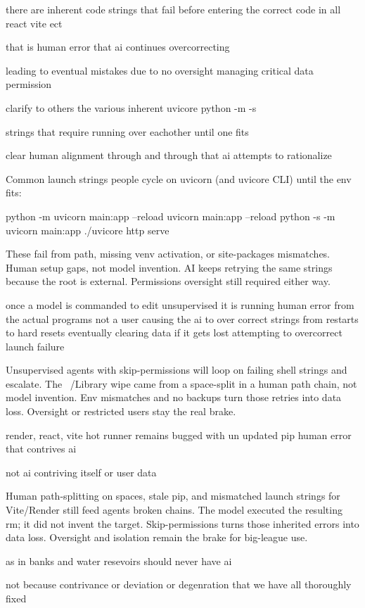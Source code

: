 there are inherent code strings that fail before entering the correct code in all react vite ect

that is human error that ai continues overcorrecting

leading to eventual mistakes due to no oversight managing critical data permission

clarify to others the various inherent uvicore python -m -s 

strings that require running over eachother until one fits

clear human alignment through and through that ai attempts to rationalize

Common launch strings people cycle on uvicorn (and uvicore CLI) until the env fits:

python -m uvicorn main:app --reload
uvicorn main:app --reload
python -s -m uvicorn main:app
./uvicore http serve

These fail from path, missing venv activation, or site-packages mismatches. Human setup gaps, not model invention. AI keeps retrying the same strings because the root is external. Permissions oversight still required either way.

once a model is commanded to edit unsupervised it is running human error from the actual programs not a user 
causing the ai to over correct strings from restarts to hard resets eventually clearing data if it gets lost attempting to overcorrect launch failure

Unsupervised agents with skip-permissions will loop on failing shell strings and escalate. The ~/Library wipe came from a space-split in a human path chain, not model invention. Env mismatches and no backups turn those retries into data loss. Oversight or restricted users stay the real brake.

render, react, vite hot runner remains bugged with un updated pip human error that contrives ai

not ai contriving itself or user data

Human path-splitting on spaces, stale pip, and mismatched launch strings for Vite/Render still feed agents broken chains. The model executed the resulting rm; it did not invent the target. Skip-permissions turns those inherited errors into data loss. Oversight and isolation remain the brake for big-league use.

as in banks and water resevoirs should never have ai

not because contrivance or deviation or degenration that we have all thoroughly fixed 

